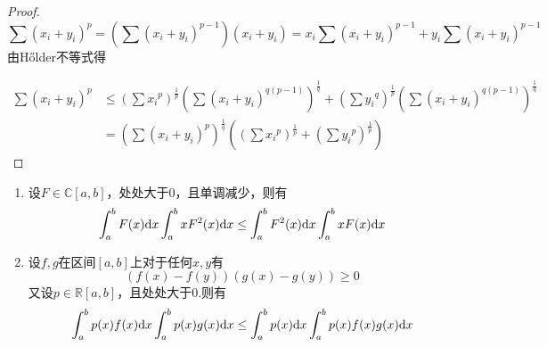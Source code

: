 \begin{proof}

    $$\sum{(x_i + y_i)}^p = \left( \sum{(x_i + y_i)}^{p-1} \right) (x_i + y_i) = x_i \sum{(x_i + y_i)}^{p-1} + y_i \sum{(x_i+ y_i)^{p-1}}$$
    由\textup{H{\H o}lder}不等式得
    
    \begin{align*}
        \sum{(x_i + y_i)}^p &\leq \left(\sum{{x_i}^p}\right)^{\frac{1}{p}} \left(\sum{(x_i + y_i)^{q(p-1)}}\right)^{\frac{1}{q}} + \left(\sum{{y_i}^q}\right)^{\frac{1}{p}} \left(\sum{(x_i + y_i)^{q(p-1)}}\right)^{\frac{1}{q}}\\
        &= \left( \sum{(x_i + y_i)}^p \right) ^{\frac{1}{q}} \left( \left(\sum{{x_i}^p}\right)^{\frac{1}{p}}  + \left(\sum{{y_i}^{p}}\right)^{\frac{1}{p}} \right)
    \end{align*}

\end{proof}

\begin{theorem}

    \begin{enumerate}
        
        \item 设$F\in\mathbb{C}[a,b]$，处处大于$0$，且单调减少，则有
              $$ \int_{a}^{b}{F(x)}\mathrm{d} x\int_{a}^{b}{xF^2(x)}\mathrm{d} x \leq \int_{a}^{b}{F^2(x)}\mathrm{d} x \int_{a}^{b}{xF(x)}\mathrm{d} x $$

        \item 设$f,g$在区间$[a,b]$上对于任何$x,y$有
              $$ (f(x)-f(y))(g(x)-g(y))\geq 0 $$
              又设$p\in\mathbb{R}[a,b]$，且处处大于$0$.则有
              $$ \int_{a}^{b}{p(x)f(x)}\mathrm{d} x\int_{a}^{b}{p(x)g(x)}\mathrm{d} x \leq \int_{a}^{b}{p(x)}\mathrm{d} x \int_{a}^{b}{p(x)f(x)g(x)}\mathrm{d} x $$

    \end{enumerate}

\end{theorem}

